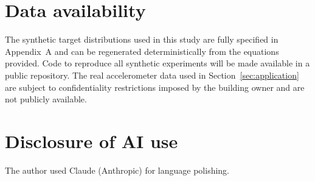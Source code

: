 \section*{Data availability}
The synthetic target distributions used in this study are fully
specified in Appendix~A and can be regenerated deterministically
from the equations provided. Code to reproduce all synthetic
experiments will be made available in a public repository. The
real accelerometer data used in Section~\ref{sec:application} are
subject to confidentiality restrictions imposed by the building
owner and are not publicly available.

\section*{Disclosure of AI use}
The author used Claude (Anthropic) for language polishing.
